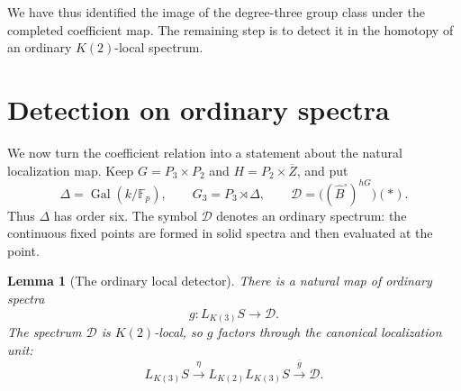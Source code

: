 \documentclass[11pt]{article}
\numberwithin{equation}{section}
\newtheorem{lemma}[theorem]{Lemma}
\theoremstyle{definition}
\theoremstyle{remark}
\begin{document}
We have thus identified the image of the degree-three group class
under the completed coefficient map.  The remaining step is to
detect it in the homotopy of an ordinary $K(2)$-local spectrum.

\section{Detection on ordinary spectra}
\label{sec:detection}

We now turn the coefficient relation into a statement about the natural
localization map.  Keep $G=P_3\times P_2$ and
$H=P_2\times\overline Z$, and put
\[
 \Delta=\operatorname{Gal}(k/\mathbb F_p),\qquad
 G_3=P_3\rtimes\Delta,\qquad
 \mathcal D=\bigl((\widehat B^{\square})^{hG}\bigr)(*).
\]
Thus $\Delta$ has order six.  The symbol $\mathcal D$ denotes an ordinary spectrum:
the continuous fixed points are formed in solid spectra and then evaluated
at the point.

\begin{lemma}[The ordinary local detector]\label{lem:local-detector}
There is a natural map of ordinary spectra
\begin{equation}\label{eq:ordinary-detector}
 g:L_{K(3)}S\longrightarrow\mathcal D.
\end{equation}
The spectrum $\mathcal D$ is $K(2)$-local, so $g$ factors through the canonical
localization unit:
\begin{equation}\label{eq:detector-factorization}
 L_{K(3)}S\xrightarrow{\eta}L_{K(2)}L_{K(3)}S
       \xrightarrow{\overline g}\mathcal D.
\end{equation}
\end{lemma}
\end{document}
